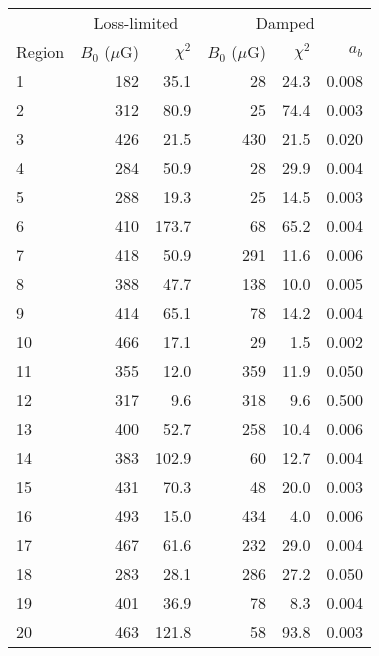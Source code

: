\begin{tabular}{@{} l rr rrr @{}}
\toprule
{} & \multicolumn{2}{c}{Loss-limited}
   & \multicolumn{3}{c}{Damped} \\
\cmidrule(lr){2-3} \cmidrule(l){4-6}
Region & $B_0$ ($\mu$G) & $\chi^2$
       & $B_0$ ($\mu$G) & $\chi^2$ & $a_b$ \\
\midrule
 1 & 182 &  35.1 &  28 & 24.3 & 0.008 \\
 2 & 312 &  80.9 &  25 & 74.4 & 0.003 \\
 3 & 426 &  21.5 & 430 & 21.5 & 0.020 \\
\cmidrule{1-6}
 4 & 284 &  50.9 &  28 & 29.9 & 0.004 \\
 5 & 288 &  19.3 &  25 & 14.5 & 0.003 \\
 6 & 410 & 173.7 &  68 & 65.2 & 0.004 \\
 7 & 418 &  50.9 & 291 & 11.6 & 0.006 \\
 8 & 388 &  47.7 & 138 & 10.0 & 0.005 \\
 9 & 414 &  65.1 &  78 & 14.2 & 0.004 \\
10 & 466 &  17.1 &  29 &  1.5 & 0.002 \\
\cmidrule{1-6}
11 & 355 &  12.0 & 359 & 11.9 & 0.050 \\
12 & 317 &   9.6 & 318 &  9.6 & 0.500 \\
13 & 400 &  52.7 & 258 & 10.4 & 0.006 \\
\cmidrule{1-6}
14 & 383 & 102.9 &  60 & 12.7 & 0.004 \\
15 & 431 &  70.3 &  48 & 20.0 & 0.003 \\
16 & 493 &  15.0 & 434 &  4.0 & 0.006 \\
17 & 467 &  61.6 & 232 & 29.0 & 0.004 \\
\cmidrule{1-6}
18 & 283 &  28.1 & 286 & 27.2 & 0.050 \\
19 & 401 &  36.9 &  78 &  8.3 & 0.004 \\
20 & 463 & 121.8 &  58 & 93.8 & 0.003 \\
\bottomrule
\end{tabular}

